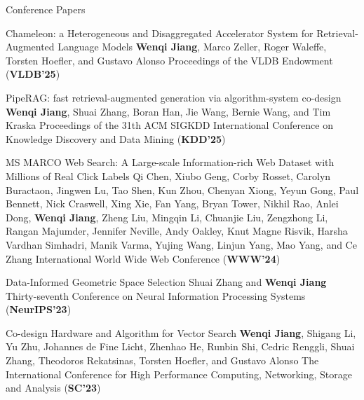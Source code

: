 \begin{rSection}{Conference Papers}
\begin{enumerate}[label={[\arabic*]}]

\item 
\begin{Pub}{Chameleon: a Heterogeneous and Disaggregated Accelerator System for Retrieval-Augmented Language Models}
{\textbf{Wenqi Jiang}, Marco Zeller, Roger Waleffe, Torsten Hoefler, and Gustavo Alonso}
{Proceedings of the VLDB Endowment (\textbf{VLDB'25})}
\end{Pub}

\item 
\begin{Pub}{PipeRAG: fast retrieval-augmented generation via algorithm-system co-design}
{\textbf{Wenqi Jiang}, Shuai Zhang, Boran Han, Jie Wang, Bernie Wang, and Tim Kraska}
{Proceedings of the 31th ACM SIGKDD International Conference on Knowledge Discovery and Data Mining (\textbf{KDD'25})}
\end{Pub}

\item 
\begin{Pub}{MS MARCO Web Search: A Large-scale Information-rich Web Dataset with Millions of Real Click Labels}
{Qi Chen, Xiubo Geng, Corby Rosset, Carolyn Buractaon, Jingwen Lu, Tao Shen, Kun Zhou, Chenyan Xiong, Yeyun Gong, Paul Bennett, Nick Craswell, Xing Xie, Fan Yang, Bryan Tower, Nikhil Rao, Anlei Dong, \textbf{Wenqi Jiang}, Zheng Liu, Mingqin Li, Chuanjie Liu, Zengzhong Li, Rangan Majumder, Jennifer Neville, Andy Oakley, Knut Magne Risvik, Harsha Vardhan Simhadri, Manik Varma, Yujing Wang, Linjun Yang, Mao Yang, and Ce Zhang}
{International World Wide Web Conference (\textbf{WWW'24})}
\end{Pub}

\item 
\begin{Pub}{Data-Informed Geometric Space Selection}
{Shuai Zhang and \textbf{Wenqi Jiang}}
{Thirty-seventh Conference on Neural Information Processing Systems (\textbf{NeurIPS'23})}
\end{Pub}

\item 
\begin{Pub}{Co-design Hardware and Algorithm for Vector Search}
{\textbf{Wenqi Jiang}, Shigang Li, Yu Zhu, Johannes de Fine Licht, Zhenhao He, Runbin Shi, Cedric Renggli, Shuai Zhang, Theodoros Rekatsinas, Torsten Hoefler, and Gustavo Alonso}
{The International Conference for High Performance Computing, Networking, Storage and Analysis (\textbf{SC'23})}
\end{Pub}


\end{enumerate}
\end{rSection}
